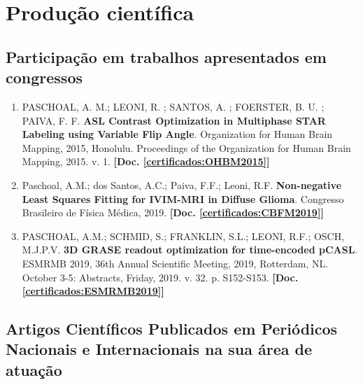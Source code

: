 \documentclass[a4paper,oneside,10pt]{article}
\begin{document}
\newpage
\section{Produção científica}
\subsection{Participação em trabalhos apresentados em congressos}
\vspace{0.3cm}

\begin{enumerate}
\renewcommand{\labelenumi}{{\large\bfseries\arabic{enumi}.}}

\item 	PASCHOAL, A. M.; LEONI, R. ; SANTOS, A. ; FOERSTER, B. U. ; PAIVA, F. F.  \textbf{ASL Contrast Optimization in Multiphase STAR Labeling using Variable Flip Angle}. Organization for Human Brain Mapping, 2015, Honolulu. Proceedings of the Organization for Human Brain Mapping, 2015. v. 1. \textbf{[Doc. \ref{certificados:OHBM2015}]}

\item Paschoal, A.M.; dos Santos, A.C.; Paiva, F.F.; Leoni, R.F. \textbf{Non-negative Least Squares Fitting for IVIM-MRI in Diffuse Glioma}. Congresso Brasileiro de Física Médica, 2019. \textbf{[Doc. \ref{certificados:CBFM2019}]}

\item PASCHOAL, A.M.; SCHMID, S.; FRANKLIN, S.L.; LEONI, R.F.; OSCH, M.J.P.V. \textbf{3D GRASE readout optimization for time-encoded pCASL}. ESMRMB 2019, 36th Annual Scientific Meeting, 2019, Rotterdam, NL. October 3-5: Abstracts, Friday, 2019. v. 32. p. S152-S153. \textbf{[Doc. \ref{certificados:ESMRMB2019}]}

\end{enumerate}

\subsection{Artigos Científicos Publicados em Periódicos Nacionais e Internacionais na sua área de atuação}
\vspace{0.3cm}
\end{document}
